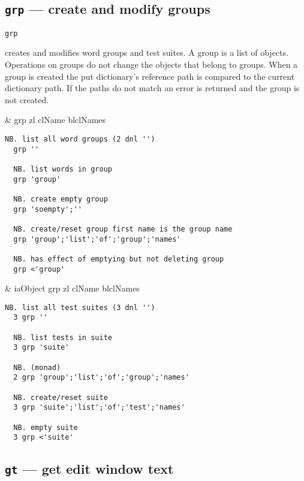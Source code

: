 \subsection{\texttt{grp} --- create and modify groups}\label{ss:grp}

\hypertarget{il:grp}{\texttt{grp}} creates and modifies word groups
 and test suites. A group is a list of objects. Operations on groups do not change 
 the objects that belong to groups. When a group is created the
 put dictionary's reference path is compared to the current dictionary path. 
 If the paths do not match an error is returned and the group is not created. 

\begin{wordhead}
\monad & grp zl \argsep clName \argsep blclNames \\
\end{wordhead}
\begin{lstlisting}[frame=single,framerule=0pt] 
  NB. list all word groups (2 dnl '')
  grp ''    
  
  NB. list words in group    
  grp 'group'  
  
  NB. create empty group 
  grp 'soempty';''

  NB. create/reset group first name is the group name
  grp 'group';'list';'of';'group';'names'

  NB. has effect of emptying but not deleting group 
  grp <'group' 
\end{lstlisting}

\begin{wordhead}
\dyad & iaObject grp zl \argsep clName \argsep blclNames \\
\end{wordhead}
\begin{lstlisting}[frame=single,framerule=0pt] 
  NB. list all test suites (3 dnl '')
  3 grp ''  
  
  NB. list tests in suite   
  3 grp 'suite' 
  
  NB. (monad)
  2 grp 'group';'list';'of';'group';'names'  
  
  NB. create/reset suite
  3 grp 'suite';'list';'of';'test';'names'  
  
  NB. empty suite  
  3 grp <'suite' 
\end{lstlisting}


\subsection{\texttt{gt} --- get edit window text} 


